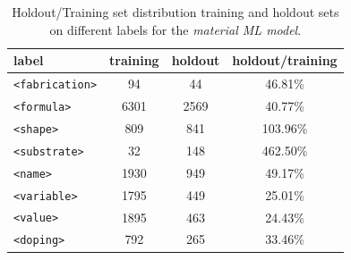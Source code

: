\documentclass{article}
\begin{document}
\begin{table}[ht]
\centering\small
\begin{tabular}{lccc}
\toprule
label & \textbf{training}  & \textbf{holdout} & \textbf{holdout/training }     \\
\midrule
\texttt{<fabrication>}  & 94    & 44    & 46.81\%   \\
\texttt{<formula>}      & 6301  & 2569  & 40.77\%   \\
\texttt{<shape>}        & 809   & 841   & 103.96\%   \\
\texttt{<substrate>}    & 32    & 148   & 462.50\%   \\
\texttt{<name>}         & 1930  & 949   & 49.17\%   \\
\texttt{<variable>}     & 1795  & 449   & 25.01\%   \\
\texttt{<value>}        & 1895  & 463   & 24.43\%   \\
\texttt{<doping>}       & 792   & 265   & 33.46\%   \\
\bottomrule

\end{tabular}

\caption{Holdout/Training set distribution training and holdout sets on different labels for the \textit{material ML model}.}
\label{tab:training-holdout-labels-distribution-annex}
\end{table}
\end{document}
